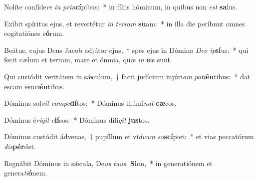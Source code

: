\item Nolíte confíde\textit{re} \textit{in} \textit{prin}\textbf{cí}pibus:~* in fíliis hóminum, in quibus non \textit{est} \textbf{sa}lus.
\item Exíbit spíritus ejus, et revertétur \textit{in} \textit{ter}\textit{ram} \textbf{su}am:~* in illa die períbunt omnes cogitatiónes \textit{e}\textbf{ó}rum.
\item Beátus, cujus Deus Jacob adjútor ejus,~† spes ejus in Dómino \textit{De}\textit{o} \textit{ip}\textbf{sí}us:~* qui fecit cælum et terram, mare et ómnia, quæ \textit{in} \textbf{e}is sunt.
\item Qui custódit veritátem in sǽculum,~† facit judícium injúri\textit{am} \textit{pa}\textit{ti}\textbf{én}tibus:~* dat escam esu\textit{ri}\textbf{én}tibus.
\item Dóminus sol\textit{vit} \textit{com}\textit{pe}\textbf{dí}tos:~* Dóminus illúmi\textit{nat} \textbf{cæ}cos.
\item Dóminus é\textit{ri}\textit{git} \textit{e}\textbf{lí}sos:~* Dóminus díli\textit{git} \textbf{jus}tos.
\item Dóminus custódit ádvenas,~† pupíllum et ví\textit{du}\textit{am} \textit{su}\textbf{scí}piet:~* et vias peccatórum \textit{dis}\textbf{pér}det.
\item Regnábit Dóminus in sǽcula, De\textit{us} \textit{tu}\textit{us}, \textbf{Si}on,~* in generatiónem et genera\textit{ti}\textbf{ó}nem.
